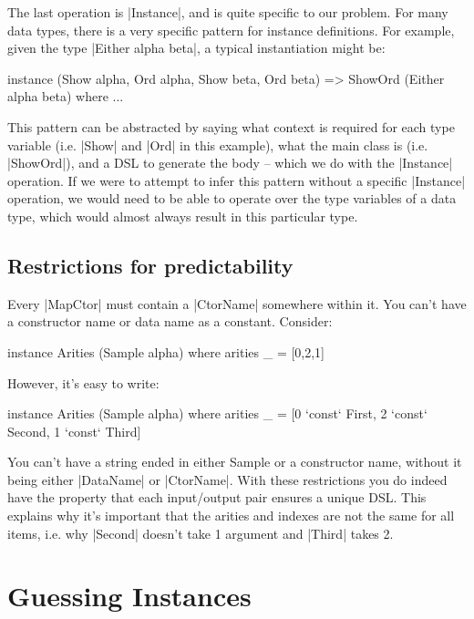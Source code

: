 \documentclass[preprint]{sigplanconf}
\begin{document}
The last operation is |Instance|, and is quite specific to our problem. For many data types, there is a very specific pattern for instance definitions. For example, given the type |Either alpha beta|, a typical instantiation might be:

\begin{code}
instance (Show alpha, Ord alpha, Show beta, Ord beta) => ShowOrd (Either alpha beta) where
    ...
\end{code}

This pattern can be abstracted by saying what context is required for each type variable (i.e. |Show| and |Ord| in this example), what the main class is (i.e. |ShowOrd|), and a DSL to generate the body -- which we do with the |Instance| operation. If we were to attempt to infer this pattern without a specific |Instance| operation, we would need to be able to operate over the type variables of a data type, which would almost always result in this particular type.

\subsection{Restrictions for predictability}
\label{sec:predictability}

Every |MapCtor| must contain a |CtorName| somewhere within it. You can't have a constructor name or data name as a constant. Consider:

\begin{code}
instance Arities (Sample alpha) where
    arities _ = [0,2,1]
\end{code}

However, it's easy to write:

\begin{code}
instance Arities (Sample alpha) where
    arities _ = [0 `const` First{}, 2 `const` Second{}, 1 `const` Third{}]
\end{code}

You can't have a string ended in either Sample or a constructor name, without it being either |DataName| or |CtorName|.
With these restrictions you do indeed have the property that each input/output pair ensures a unique DSL. This explains why it's important that the arities and indexes are not the same for all items, i.e. why |Second| doesn't take 1 argument and |Third| takes 2.

\section{Guessing Instances}
\label{sec:guess}
\end{document}

